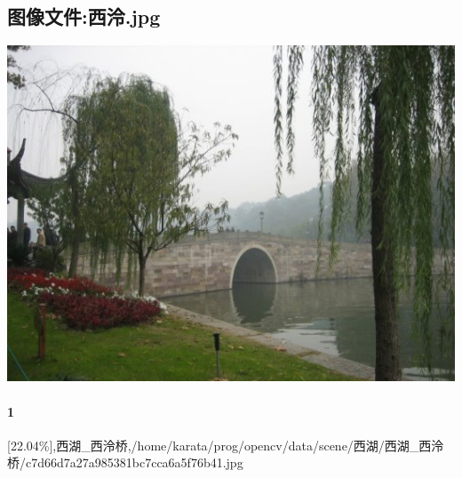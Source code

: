 \subsection{图像文件:西泠.jpg}
\includegraphics[width=15cm,angle=0]{西泠.jpg}

\paragraph{1}
[22.04\%],西湖\_西泠桥,/home/karata/prog/opencv/data/scene/西湖/西湖\_西泠桥/c7d66d7a27a985381bc7cca6a5f76b41.jpg

